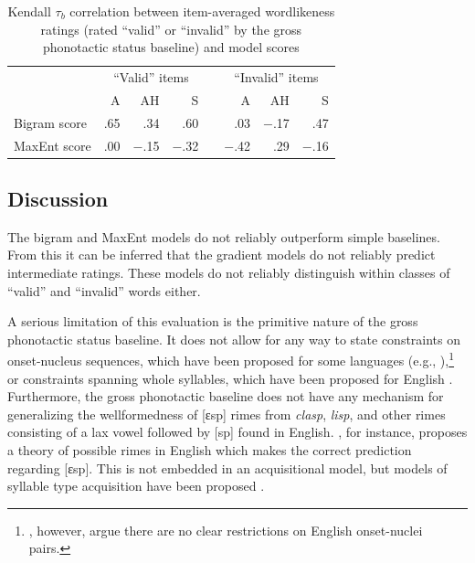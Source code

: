 \begin{table}
\centering
\begin{tabular}{l rrr c rrr}
\toprule                
             & \multicolumn{3}{c}{``Valid'' items} && \multicolumn{3}{c}{``Invalid'' items} \\
\cmidrule{2-4} \cmidrule{6-8}
             &         A &       AH &        S &&     A  &       AH &          S \\
\midrule
Bigram score &     {.65} &    {.34} &    {.60} &&    {.03} & {$-$.17} &    {.47} \\
MaxEnt score &     {.00} & {$-$.15} & {$-$.32} && {$-$.42} &    {.29} & {$-$.16} \\
\bottomrule
\end{tabular}
\caption{Kendall $\tau_{b}$ correlation between item-averaged wordlikeness ratings (rated ``valid'' or ``invalid'' by the gross phonotactic status baseline) and model scores}
\label{resid}
\end{table}

\subsection{Discussion}

The bigram and MaxEnt models do not reliably outperform simple baselines. From this it can be inferred that the gradient models do not reliably predict intermediate ratings. These models do not reliably distinguish within classes of ``valid'' and ``invalid'' words either.

A serious limitation of this evaluation is the primitive nature of the gross phonotactic status baseline. It does not allow for any way to state constraints on onset-nucleus sequences, which have been proposed for some languages (e.g., \citealt{Kirby2007}),\footnote{\citet{Kessler1997}, however, argue there are no clear restrictions on English onset-nuclei pairs.} or constraints spanning whole syllables, which have been proposed for English \citep[e.g.,][]{Berkley1994b,Berkley1994a,Coetzee2008b,Fudge1969}. Furthermore, the gross phonotactic baseline does not have any mechanism for generalizing the wellformedness of [ɛsp] rimes from \emph{clasp}, \emph{lisp}, and other rimes consisting of a lax vowel followed by [sp] found in English. \citet{Borowsky1989}, for instance, proposes a theory of possible rimes in English which makes the correct prediction regarding [ɛsp]. This is not embedded in an acquisitional model, but models of syllable type acquisition have been proposed \citep[e.g.,][]{Fikkert1994,Levelt2000,Pan2003,Pan2004}. 

